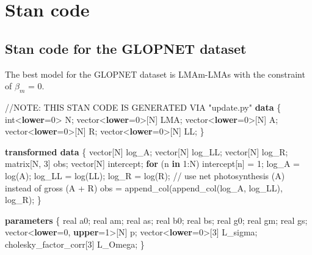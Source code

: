 \documentclass[
  12pt,
  letterpaper,
  DIV=11,
  numbers=noendperiod]{scrartcl}
\newenvironment{Shaded}{\begin{snugshade}}{\end{snugshade}}
\newcommand{\AlertTok}[1]{\textcolor[rgb]{0.68,0.00,0.00}{#1}}
\newcommand{\CommentTok}[1]{\textcolor[rgb]{0.37,0.37,0.37}{#1}}
\newcommand{\ControlFlowTok}[1]{\textcolor[rgb]{0.00,0.23,0.31}{\textbf{#1}}}
\newcommand{\DataTypeTok}[1]{\textcolor[rgb]{0.68,0.00,0.00}{#1}}
\newcommand{\DecValTok}[1]{\textcolor[rgb]{0.68,0.00,0.00}{#1}}
\newcommand{\KeywordTok}[1]{\textcolor[rgb]{0.00,0.23,0.31}{\textbf{#1}}}
\newcommand{\NormalTok}[1]{\textcolor[rgb]{0.00,0.23,0.31}{#1}}
\numberwithin{equation}{section}
\begin{document}
\newpage

\section{Stan code}\label{stan-code}

\subsection{Stan code for the GLOPNET
dataset}\label{stan-code-for-the-glopnet-dataset}

The best model for the GLOPNET dataset is LMAm-LMAs with the constraint
of \(\beta_m\) = 0.

\begin{Shaded}
\begin{Highlighting}[]
\CommentTok{//}\AlertTok{NOTE}\CommentTok{: THIS STAN CODE IS GENERATED VIA "update.py"}
\KeywordTok{data}\NormalTok{ \{}
  \DataTypeTok{int}\NormalTok{\textless{}}\KeywordTok{lower}\NormalTok{=}\DecValTok{0}\NormalTok{\textgreater{} N;}
  \DataTypeTok{vector}\NormalTok{\textless{}}\KeywordTok{lower}\NormalTok{=}\DecValTok{0}\NormalTok{\textgreater{}[N] LMA;}
  \DataTypeTok{vector}\NormalTok{\textless{}}\KeywordTok{lower}\NormalTok{=}\DecValTok{0}\NormalTok{\textgreater{}[N] A;}
  \DataTypeTok{vector}\NormalTok{\textless{}}\KeywordTok{lower}\NormalTok{=}\DecValTok{0}\NormalTok{\textgreater{}[N] R;}
  \DataTypeTok{vector}\NormalTok{\textless{}}\KeywordTok{lower}\NormalTok{=}\DecValTok{0}\NormalTok{\textgreater{}[N] LL;}
\NormalTok{\}}

\KeywordTok{transformed data}\NormalTok{ \{}
  \DataTypeTok{vector}\NormalTok{[N] log\_A;}
  \DataTypeTok{vector}\NormalTok{[N] log\_LL;}
  \DataTypeTok{vector}\NormalTok{[N] log\_R;}
  \DataTypeTok{matrix}\NormalTok{[N, }\DecValTok{3}\NormalTok{] obs;}
  \DataTypeTok{vector}\NormalTok{[N] intercept;}
  \ControlFlowTok{for}\NormalTok{ (n }\ControlFlowTok{in} \DecValTok{1}\NormalTok{:N)}
\NormalTok{    intercept[n] = }\DecValTok{1}\NormalTok{;}
\NormalTok{  log\_A = log(A);}
\NormalTok{  log\_LL = log(LL);}
\NormalTok{  log\_R = log(R);}
  \CommentTok{// use net photosynthesis (A) instead of gross (A + R)}
\NormalTok{  obs = append\_col(append\_col(log\_A, log\_LL), log\_R);}
\NormalTok{\}}

\KeywordTok{parameters}\NormalTok{ \{}
  \DataTypeTok{real}\NormalTok{ a0;}
  \DataTypeTok{real}\NormalTok{ am;}
  \DataTypeTok{real}\NormalTok{ as;}
  \DataTypeTok{real}\NormalTok{ b0;}
  \DataTypeTok{real}\NormalTok{ bs;}
  \DataTypeTok{real}\NormalTok{ g0;}
  \DataTypeTok{real}\NormalTok{ gm;}
  \DataTypeTok{real}\NormalTok{ gs;}
  \DataTypeTok{vector}\NormalTok{\textless{}}\KeywordTok{lower}\NormalTok{=}\DecValTok{0}\NormalTok{, }\KeywordTok{upper}\NormalTok{=}\DecValTok{1}\NormalTok{\textgreater{}[N] p;}
  \DataTypeTok{vector}\NormalTok{\textless{}}\KeywordTok{lower}\NormalTok{=}\DecValTok{0}\NormalTok{\textgreater{}[}\DecValTok{3}\NormalTok{] L\_sigma;}
  \DataTypeTok{cholesky\_factor\_corr}\NormalTok{[}\DecValTok{3}\NormalTok{] L\_Omega;}
\NormalTok{\}}


\end{Highlighting}
\end{Shaded}
\end{document}
